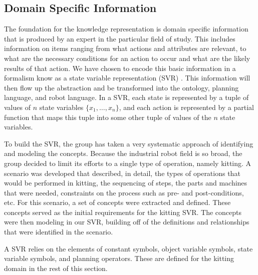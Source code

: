 \documentclass[a4paper, 10pt, conference]{ieeeconf}      %
\begin{document}
\subsection{Domain Specific Information}
The foundation for the knowledge representation is domain specific information that is produced by an expert in the particular field of study. This includes
information on items ranging from what actions and attributes are relevant, to what are the necessary conditions for an action to occur and what are the
likely results of that action. We have chosen to encode this basic information in a formalism know as a state variable representation (SVR) \cite{NAU.2004}.
This information will then flow up the abstraction and be transformed into the ontology, planning language, and robot language.
In a SVR, each state is represented by a tuple of values of $n$ state variables $\lbrace x_1,\dots,x_n\rbrace$, and each action is represented by a partial function that maps this tuple into some other tuple of values of the $n$ state variables. 

To build the SVR, the group has taken a very systematic approach of identifying and modeling the concepts. Because the industrial robot field is so broad, the group decided to limit its efforts to a single type of operation, namely kitting. A scenario was developed that described, in detail, the types of operations that would be performed in kitting, the sequencing of steps, the parts and machines that were needed, constraints on the process such as pre- and post-conditions, etc. For this scenario, a set of concepts were extracted and defined. These concepts served as the initial requirements for the kitting SVR. The concepts were then modeling in our SVR, building off of the definitions and relationships that were identified in the scenario.

A SVR relies on the elements of constant symbols, object variable symbols, state variable symbols, and planning operators. These are defined for the kitting domain in the rest of this section.
\end{document}
